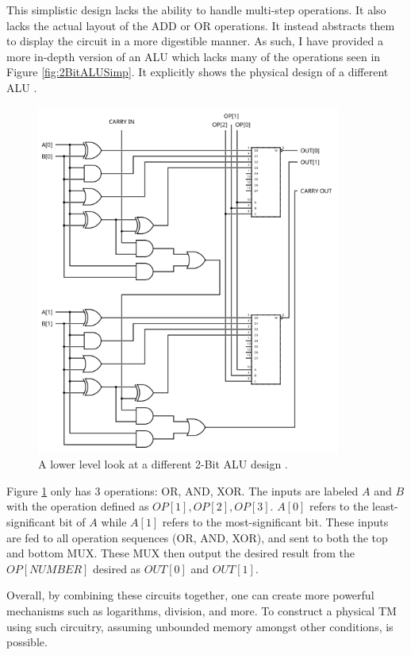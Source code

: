 This simplistic design lacks the ability to handle multi-step operations.
It also lacks the actual layout of the ADD or OR operations.
It instead abstracts them to display the circuit in a more digestible manner.
As such, I have provided a more in-depth version of an ALU which lacks many of the operations seen in Figure \ref{fig:2BitALUSimp}.
It explicitly shows the physical design of a different ALU \cite{ALUImg}.

\begin{figure}[htb]
    \centering
    \includegraphics[width=10cm]{Images/2-bit_ALU.svg.png}
       \caption{A lower level look at a different 2-Bit ALU design \cite{ALUImg}.}
           \label{fig:2BitALUAdv}
\end{figure}

Figure \ref{fig:2BitALUAdv} only has 3 operations: OR, AND, XOR.
The inputs are labeled $A$ and $B$ with the operation defined as $OP[1], OP[2], OP[3]$.
$A[0]$ refers to the least-significant bit of $A$ while $A[1]$ refers to the most-significant bit.
These inputs are fed to all operation sequences (OR, AND, XOR), and sent to both the top and bottom MUX.
These MUX then output the desired result from the $OP[NUMBER]$ desired as $OUT[0]$ and $OUT[1]$.

Overall, by combining these circuits together, one can create more powerful mechanisms such as logarithms, division, and more.
To construct a physical TM using such circuitry, assuming unbounded memory amongst other conditions, is possible.

